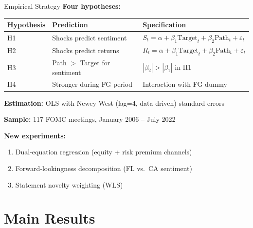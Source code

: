 \documentclass[aspectratio=169, 11pt]{beamer}
\begin{document}
\begin{frame}{Empirical Strategy}
\textbf{Four hypotheses:}

\vspace{0.5em}
\begin{tabular}{lll}
\toprule
Hypothesis & Prediction & Specification \\
\midrule
H1 & Shocks predict sentiment & $S_t = \alpha + \beta_1 \text{Target}_t + \beta_2 \text{Path}_t + \varepsilon_t$ \\
H2 & Shocks predict returns & $R_t = \alpha + \beta_1 \text{Target}_t + \beta_2 \text{Path}_t + \varepsilon_t$ \\
H3 & Path $>$ Target for sentiment & $|\beta_2| > |\beta_1|$ in H1 \\
H4 & Stronger during FG period & Interaction with FG dummy \\
\bottomrule
\end{tabular}

\vspace{0.8em}
\textbf{Estimation:} OLS with Newey-West (lag=4, data-driven) standard errors

\vspace{0.3em}
\textbf{Sample:} 117 FOMC meetings, January 2006 -- July 2022

\vspace{0.5em}
\textcolor{success}{\textbf{New experiments:}}
\begin{enumerate}
  \item Dual-equation regression (equity + risk premium channels)
  \item Forward-lookingness decomposition (FL vs.\ CA sentiment)
  \item Statement novelty weighting (WLS)
\end{enumerate}
\end{frame}

\section{Main Results}
\end{document}
